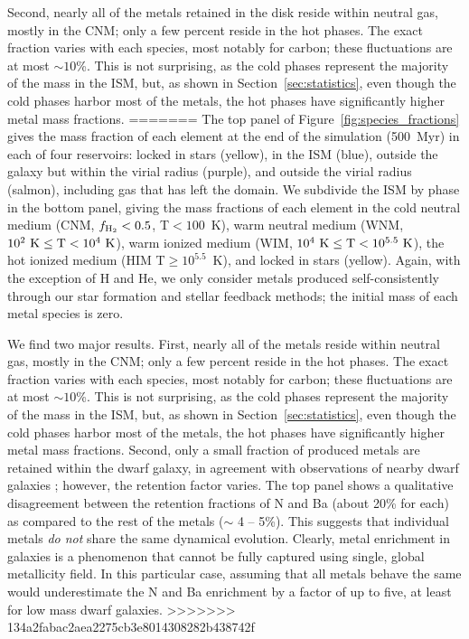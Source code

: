 \documentclass[twocolumn]{aastex61}
\begin{document}
    Second,
nearly all of the metals 
    retained in the disk
reside within neutral gas, mostly in the CNM; only a few percent
reside in the hot phases. The exact fraction varies with each species, most notably for carbon; these fluctuations are at most $\sim 10$\%. This is not surprising, as the cold phases represent the majority of the mass in the ISM, but, as shown in Section~\ref{sec:statistics}, even though the cold phases harbor most of the metals, the hot phases have significantly higher metal mass fractions. 
=======
The top panel of Figure~\ref{fig:species_fractions} gives the mass fraction of each element at the end of the simulation (500~Myr) in each of four reservoirs: locked in stars (yellow), in the ISM (blue), outside the galaxy but within the virial radius (purple), and outside the virial radius (salmon), including gas that has left the domain. We subdivide the ISM by phase in the bottom panel, giving the mass fractions of each element in the cold neutral medium (CNM, $f_{\rm H_2} < 0.5$,  T$< 100$~K), warm neutral medium (WNM, $10^2~\rm{K}\le \rm{T} < 10^4~\rm{K}$), warm ionized medium (WIM, $10^4~\rm{K}\le \rm{T} < 10^{5.5}~\rm{K}$), the hot ionized medium (HIM T$\ge 10^{5.5}$~K), and locked in stars (yellow). Again, with the exception of H and He, we only consider metals produced self-consistently through our star formation and stellar feedback methods; the initial mass of each metal species is zero.

We find two major results. First, nearly all of the metals reside within neutral gas, mostly in the CNM; only a few percent reside in the hot phases. The exact fraction varies with each species, most notably for carbon; these fluctuations are at most $\sim 10$\%. This is not surprising, as the cold phases represent the majority of the mass in the ISM, but, as shown in Section~\ref{sec:statistics}, even though the cold phases harbor most of the metals, the hot phases have significantly higher metal mass fractions. Second, only a small fraction of produced metals are retained within the dwarf galaxy, in agreement with observations of nearby dwarf galaxies \citep[see][]{Kirby2011-metals, McQuinn2015}; however, the retention factor varies. The top panel shows a qualitative disagreement between the retention fractions of N and Ba (about 20\% for each) as compared to the rest of the metals ($\sim$ 4 -- 5\%). This suggests that individual metals \textit{do not} share the same dynamical evolution. Clearly, metal enrichment in galaxies is a phenomenon that cannot be fully captured using single, global metallicity field. In this particular case, assuming that all metals behave the same would underestimate the N and Ba enrichment by a factor of up to five, at least for low mass dwarf galaxies.
>>>>>>> 134a2fabac2aea2275cb3e8014308282b438742f
\end{document}
